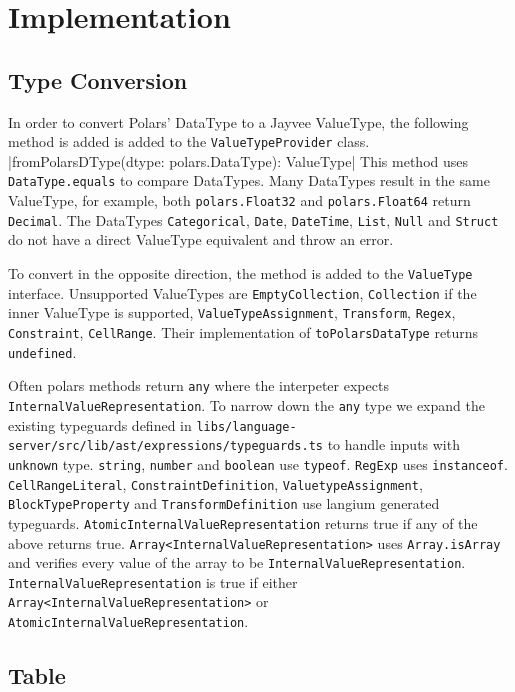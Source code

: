 \chapter{Implementation}
\label{chapter:Implementation}

\section{Type Conversion}
\label{subsection:TypeConversion}
In order to convert Polars' DataType to a Jayvee ValueType, the following method is added is added to the \Verb|ValueTypeProvider| class.
|fromPolarsDType(dtype: polars.DataType): ValueType|
This method uses \Verb|DataType.equals| to compare DataTypes.
Many DataTypes result in the same ValueType, for example, both \Verb|polars.Float32| and \Verb|polars.Float64| return \Verb|Decimal|.
The DataTypes \Verb|Categorical|, \Verb|Date|, \Verb|DateTime|, \Verb|List|, \Verb|Null| and \Verb|Struct| do not have a direct ValueType equivalent and throw an error.

To convert in the opposite direction, the  method is added to the \Verb|ValueType| interface.
Unsupported ValueTypes are \Verb|EmptyCollection|, \Verb|Collection| if the inner ValueType is supported, \Verb|ValueTypeAssignment|, \Verb|Transform|, \Verb|Regex|, \Verb|Constraint|, \Verb|CellRange|.
Their implementation of \Verb|toPolarsDataType| returns \Verb|undefined|.

Often polars methods return \Verb|any| where the interpeter expects \Verb|InternalValueRepresentation|.
To narrow down the \Verb|any| type we expand the existing typeguards defined in \Verb|libs/language-server/src/lib/ast/expressions/typeguards.ts| to handle inputs with \Verb|unknown| type.
\Verb|string|, \Verb|number| and \Verb|boolean| use \Verb|typeof|.
\Verb|RegExp| uses \Verb|instanceof|.
\Verb|CellRangeLiteral|, \Verb|ConstraintDefinition|, \Verb|ValuetypeAssignment|, \Verb|BlockTypeProperty| and \Verb|TransformDefinition| use langium generated typeguards.
\Verb|AtomicInternalValueRepresentation| returns true if any of the above returns true.
\Verb|Array<InternalValueRepresentation>| uses \Verb|Array.isArray| and verifies every value of the array to be \Verb|InternalValueRepresentation|.
\Verb|InternalValueRepresentation| is true if either \Verb|Array<InternalValueRepresentation>| or \Verb|AtomicInternalValueRepresentation|.

\section{Table}
